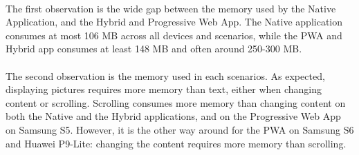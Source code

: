 \documentclass{kththesis}
\begin{document}
\begin{table}[h]
    \centering
    
    \caption{Average memory usage (MB)}
    \label{tab:memory}
\end{table}

\paragraph{}
The first observation is the wide gap between the memory used by the Native Application, and the Hybrid and Progressive Web App. The Native application consumes at most 106 MB across all devices and scenarios, while the PWA and Hybrid app consumes at least 148 MB and often around 250-300 MB.

\paragraph{}
The second observation is the memory used in each scenarios. As expected, displaying pictures requires more memory than text, either when changing content or scrolling. Scrolling consumes more memory than changing content on both the Native and the Hybrid applications, and on the Progressive Web App on Samsung S5. However, it is the other way around for the PWA on Samsung S6 and Huawei P9-Lite: changing the content requires more memory than scrolling. 
\end{document}
